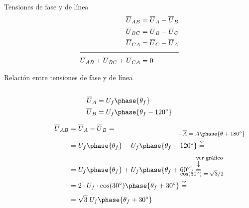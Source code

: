 \documentclass[aspectratio=169, usenames,svgnames,dvipsnames]{beamer}
\begin{document}
\begin{frame}{Tensiones de fase y de línea}
    \vspace{-5mm}
     \begin{align*}
       \overline{U}_{AB} &= \overline{U}_A - \overline{U}_B\\
       \overline{U}_{BC} &= \overline{U}_B - \overline{U}_C\\
       \overline{U}_{CA} &= \overline{U}_C - \overline{U}_A\\[-4pt]
    \cline{1-2}
       \overline{U}_{AB} + \overline{U}_{BC} + \overline{U}_{CA} &= 0    
    \end{align*}
\end{frame}


\begin{frame}{Relación entre tensiones de fase y de línea}
    \begin{columns}
    \begin{column}{0.5\columnwidth}
        \vspace{6mm}
        \begin{align*}
          \overline{U}_A &= U_f\phase{\theta_f}\\
          \overline{U}_B &= U_f\phase{\theta_f - \ang{120}}
        \end{align*}

        \vspace{-2mm}
        \begin{align*}
        \overline{U}_{AB} &= \overline{U}_A - \overline{U}_B = \\[-10pt]
        		   &= U_f\phase{\theta_f} - U_f\phase{\theta_f - \ang{120}} \overarrow[=][\downarrow]{\footnotesize {$\qquad\quad\; -\overline{A} = A\phase{\theta+\ang{180}}$}\vspace*{-1mm}} \\
        		  &= U_f\phase{\theta_f} + U_f\phase{\theta_f + \ang{60}} \overarrow[=][\downarrow]{\hspace*{10mm} \footnotesize ver gráfico\vspace*{-1mm}}\\[-11pt]
        		  &= 2 \cdot U_f \cdot \cos(\ang{30}) \phase{\theta_f + \ang{30}} \overarrow[=][\downarrow]{\footnotesize {\qquad\qquad\qquad $\cos(\ang{30})=\sqrt{3}/2$}\vspace*{-1mm}} \\[4pt]
          &= \sqrt{3} \; U_f \phase{\theta_f + \ang{30}}
        \end{align*}
    \end{column}
    

\end{columns}
\end{frame}
\end{document}
